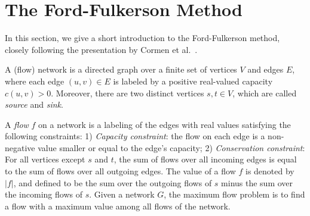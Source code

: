 \documentclass{llncs}
\begin{document}
\section{The Ford-Fulkerson Method}\label{sec:background}
%       
%   
% 
%         
%   
%   
%   
%   
%   

In this section, we give a short introduction to the Ford-Fulkerson method, closely following the presentation by Cormen et al.~\cite{CLRS09}.

% 

A (flow) network is a directed graph over a finite set of vertices $V$ and edges $E$, where each edge $(u,v)\in E$ is labeled by a positive real-valued capacity $c(u,v)>0$.
Moreover, there are two distinct vertices $s,t\in V$, which are called \emph{source} and \emph{sink}. 

A \emph{flow} $f$ on a network is a labeling of the edges with real values satisfying the following constraints: 1) \emph{Capacity constraint}: the flow on each edge is a non-negative value smaller or equal to the edge's capacity; 2) \emph{Conservation constraint}: For all vertices except $s$ and $t$, the sum of flows over all incoming edges is equal to the sum of flows over all outgoing edges. 
The value of a flow $f$ is denoted by $|f|$, and defined to be the sum over the outgoing flows of $s$ minus the sum over the incoming flows of $s$.
Given a network $G$, the maximum flow problem is to find a flow with a maximum value among all flows of the network. 
\end{document}
